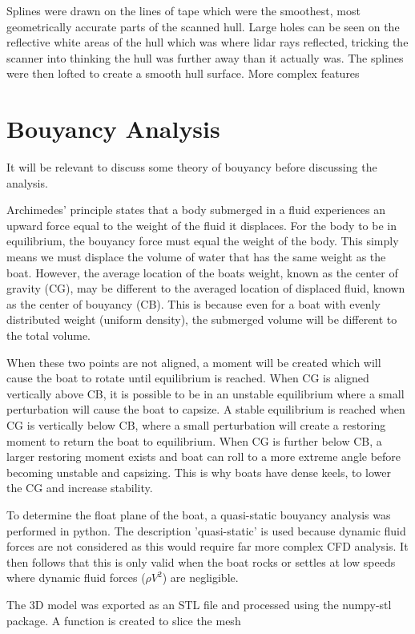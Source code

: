 \documentclass{article}
\begin{document}
Splines were drawn on the lines of tape which were the smoothest, most geometrically accurate parts of the scanned hull.
Large holes can be seen on the reflective white areas of the hull which was where lidar rays reflected, tricking the scanner into thinking the hull was further away than it actually was.
The splines were then lofted to create a smooth hull surface.
More complex features 

\section{Bouyancy Analysis}

It will be relevant to discuss some theory of bouyancy before discussing the analysis.

Archimedes' principle states that a body submerged in a fluid experiences an upward force equal to the weight of the fluid it displaces.
For the body to be in equilibrium, the bouyancy force must equal the weight of the body.
This simply means we must displace the volume of water that has the same weight as the boat.
However, the average location of the boats weight, known as the center of gravity (CG),
may be different to the averaged location of displaced fluid, known as the center of bouyancy (CB).
This is because even for a boat with evenly distributed weight (uniform density), the submerged volume will be different to the total volume.

When these two points are not aligned, a moment will be created which will cause the boat to rotate until equilibrium is reached.
When CG is aligned vertically above CB, it is possible to be in an unstable equilibrium where a small perturbation will cause the boat to capsize.
A stable equilibrium is reached when CG is vertically below CB, where a small perturbation will create a restoring moment to return the boat to equilibrium.
When CG is further below CB, a larger restoring moment exists and boat can roll to a more extreme angle before becoming unstable and capsizing.
This is why boats have dense keels, to lower the CG and increase stability.

To determine the float plane of the boat, a quasi-static bouyancy analysis was performed in python.
The description 'quasi-static' is used because dynamic fluid forces are not considered as this would require far more complex CFD analysis.
It then follows that this is only valid when the boat rocks or settles at low speeds where dynamic fluid forces ($\rho V^2$) are negligible.

The 3D model was exported as an STL file and processed using the numpy-stl package.
A function is created to slice the mesh 
\end{document}
